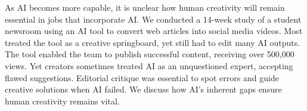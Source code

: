As AI becomes more capable, it is unclear how human creativity will remain essential in jobs that incorporate AI. We conducted a 14-week study of a student newsroom using an AI tool to convert web articles into social media videos. Most treated the tool as a creative springboard, yet still had to edit many AI outputs. The tool enabled the team to publish successful content, receiving over 500,000 views. Yet creators sometimes treated AI as an unquestioned expert, accepting flawed suggestions. Editorial critique was essential to spot errors and guide creative solutions when AI failed. We discuss how AI’s inherent gaps ensure human creativity remains vital.